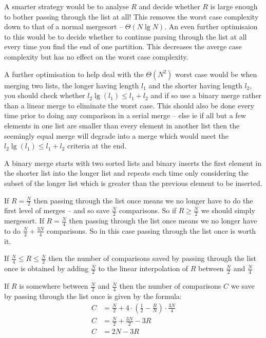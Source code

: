 \documentclass[10pt,\jkfside,a4paper]{article}
\begin{document}
\begin{enumerate}
A smarter strategy would be to analyse $R$ and decide whether $R$ is large enough to bother 
passing through the list at all! This removes the worst case complexity down to that of a 
normal mergesort -- $\Theta(N\lg N)$. An even further optimisaion to this would be to decide 
whether to continue parsing through the list at all every time you find the end of one partition. 
This decreases the averge case complexity but has no effect on the worst case complexity.

A further optimisation to help deal with the $\Theta(N^2)$ worst case would be when merging 
two lists, the longer having length $l_1$ and the shorter having length $l_2$, you should 
check whether $l_2\lg(l_1) \leq l_1 + l_2$ and if so use a binary merge rather than a linear 
merge to eliminate the worst case. This should also be done every time prior to doing any 
comparison in a serial merge -- else ie if all but a few elements in one list are smaller 
than every element in another list then the seemingly equal merge will degrade into a 
merge which would meet the $l_2\lg(l_1) \leq l_1 + l_2$ criteria at the end.

A binary merge starts with two sorted lists and binary 
inserts the first element in the shorter list into the longer list and repeats each time only 
considering the subset of the longer list which is greater than the previous element to be inserted.

If $R = \frac{N}{2}$ then passing through the list once means we no longer have to do the 
first level of merges -- and so save $\frac{N}{2}$ comparisons. So if $R \geq \frac{N}{2}$
we should simply mergesort. If $R = \frac{N}{4}$ then passing through the list once means 
we no longer have to do $\frac{N}{2} + \frac{3N}{4}$ comparisons. 
So in this case passing through the list once is worth it.

If $\frac{N}{4} \leq R \leq \frac{N}{2}$ then the number of comparisons saved by passing through 
the list once is obtained by adding $\frac{N}{2}$ to the linear interpolation of $R$ between $\frac{N}{2}$ 
and $\frac{N}{4}$

If $R$ is somewhere between $\frac{N}{2}$ and $\frac{N}{4}$ then the number of comparisons 
$C$ we save by passing through the list once is given by the formula:
\begin{equation}
\begin{split}
C &= \frac{N}{2} + 4 \cdot (\frac{1}{2} - \frac{R}{N}) \cdot \frac{3N}{4} \\
C &= \frac{N}{2} + \frac{3N}{2} - 3R \\
C &= 2N - 3R \\
\end{split}
\end{equation}


\end{enumerate}
\end{document}
